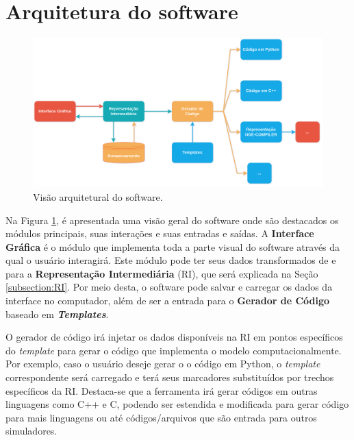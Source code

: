 \documentclass[
	12pt,				%
	openright,			%
	oneside,			%
	a4paper,			%
	main=brazil,
	english,			%
	]{ufsj-abntex2}
\begin{document}
\section{Arquitetura do software}

\begin{figure}[h]
    \centering
    \includegraphics[scale=0.125]{imgs/passos_divisao_software.png} 
    \caption{Visão arquitetural do software.}
    \label{fig::arquitetura_software}
\end{figure}

Na Figura \ref{fig::arquitetura_software}, é apresentada uma visão geral do software onde são destacados os módulos principais, suas interações e suas entradas e saídas. A \textbf{Interface Gráfica} é o módulo que implementa toda a parte visual do software através da qual o usuário interagirá. Este módulo pode ter seus dados transformados de e para a \textbf{Representação Intermediária} (RI), que será explicada na Seção \ref{subsection:RI}. Por meio desta, o software pode salvar e carregar os dados da interface no computador, além de ser a entrada para o \textbf{Gerador de Código} baseado em \textbf{\textit{Templates}}.

O gerador de código irá injetar os dados disponíveis na RI em pontos específicos do \textit{template} para gerar o código que implementa o modelo computacionalmente. Por exemplo, caso o usuário deseje gerar o o código em Python, o \textit{template} correspondente será carregado e terá seus marcadores substituídos por trechos específicos da RI. Destaca-se que a ferramenta irá gerar códigos em outras linguagens como C++ e C, podendo ser estendida e modificada para gerar código para mais linguagens ou até códigos/arquivos que são entrada para outros simuladores. 

\end{document}
